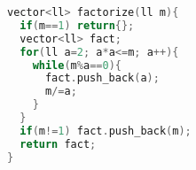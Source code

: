 \begin{lstlisting}[language=C++]
vector<ll> factorize(ll m){
  if(m==1) return{};
  vector<ll> fact;
  for(ll a=2; a*a<=m; a++){
    while(m%a==0){
      fact.push_back(a);
      m/=a;
    }
  }
  if(m!=1) fact.push_back(m);
  return fact;
}
\end{lstlisting}